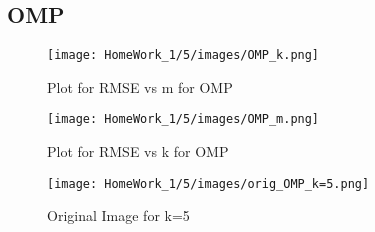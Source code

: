 \documentclass{article}
\begin{document}
\subsection*{OMP}
\begin{figure}[h!]
    \centering
        \centering
        \texttt{[image: HomeWork\_1/5/images/OMP\_k.png]}
        \caption{Plot for RMSE vs m for OMP}
\end{figure}
\begin{figure}[h!]
        \centering
        \texttt{[image: HomeWork\_1/5/images/OMP\_m.png]}
        \caption{Plot for RMSE vs k for OMP}
\end{figure}
\begin{figure}[h!]
        \centering
        \texttt{[image: HomeWork\_1/5/images/orig\_OMP\_k=5.png]}
        \caption{Original Image for k=5}
\end{figure}
\end{document}
